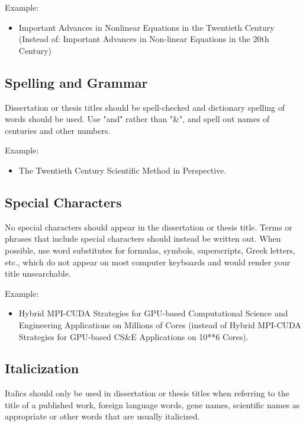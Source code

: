 Example:

\begin{itemize}
\item Important Advances in Nonlinear Equations in the Twentieth Century (Instead of: Important Advances in Non-linear Equations in the 20th Century)

\end{itemize}

\subsection{Spelling and Grammar}

Dissertation or thesis titles should be spell-checked and dictionary spelling of words should be used.  Use "and" rather than "\&", and spell out names of centuries and other numbers.

Example:

\begin{itemize}
\item The Twentieth Century Scientific Method in Perspective.

\end{itemize}

\subsection{Special Characters}

No special characters should appear in the dissertation or thesis title.  Terms or phrases that include special characters should instead be written out.  When possible, use word substitutes for formulas, symbols, superscripts, Greek letters, etc., which do not appear on most computer keyboards and would render your title unsearchable.

Example:

\begin{itemize}
\item Hybrid MPI-CUDA Strategies for GPU-based Computational Science and
Engineering Applications on Millions of Cores (instead of Hybrid
MPI-CUDA Strategies for GPU-based CS\&E Applications on 10**6 Cores).

\end{itemize}

\subsection{Italicization}

Italics should only be used in dissertation or thesis titles when referring to the title of a published work, foreign language words, gene names, scientific names as appropriate or other words that are usually italicized.

